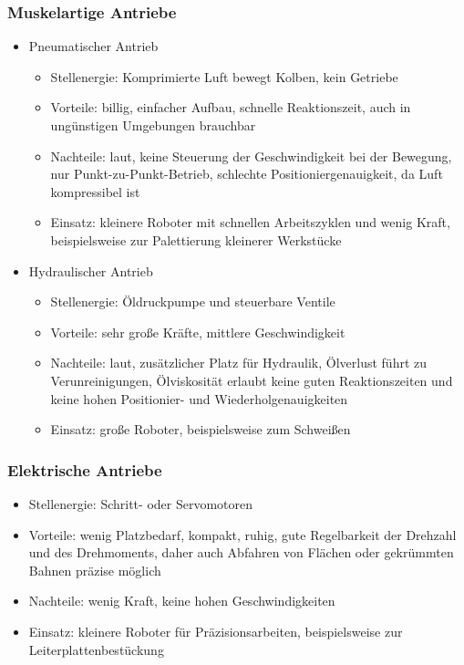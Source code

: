 \documentclass[paper=a4, fontsize=11pt]{scrartcl} %
\numberwithin{equation}{section} %
\numberwithin{figure}{section} %
\numberwithin{table}{section} %
\begin{document}
\subsubsection{Muskelartige Antriebe}

\begin{itemize}
\item Pneumatischer Antrieb
\begin{itemize}
\item Stellenergie: Komprimierte Luft bewegt Kolben, kein Getriebe
\item Vorteile: billig, einfacher Aufbau, schnelle Reaktionszeit, auch in ungünstigen Umgebungen brauchbar
\item Nachteile: laut, keine Steuerung der Geschwindigkeit bei der Bewegung, nur Punkt-zu-Punkt-Betrieb, schlechte Positioniergenauigkeit, da Luft kompressibel ist
\item Einsatz: kleinere Roboter mit schnellen Arbeitszyklen und wenig Kraft, beispielsweise zur Palettierung kleinerer Werkstücke
\end{itemize}
\item Hydraulischer Antrieb
\begin{itemize}
\item Stellenergie: Öldruckpumpe und steuerbare Ventile
\item Vorteile: sehr große Kräfte, mittlere Geschwindigkeit
\item Nachteile: laut, zusätzlicher Platz für Hydraulik, Ölverlust führt zu Verunreinigungen, Ölviskosität erlaubt keine guten Reaktionszeiten und keine hohen Positionier- und Wiederholgenauigkeiten
\item Einsatz: große Roboter, beispielsweise zum Schweißen
\end{itemize}
\end{itemize}

\subsubsection{Elektrische Antriebe}

\begin{itemize}
\item Stellenergie: Schritt- oder Servomotoren
\item Vorteile: wenig Platzbedarf, kompakt, ruhig, gute Regelbarkeit der Drehzahl und des Drehmoments, daher auch Abfahren von Flächen oder gekrümmten Bahnen präzise möglich
\item Nachteile: wenig Kraft, keine hohen Geschwindigkeiten
\item Einsatz: kleinere Roboter für Präzisionsarbeiten, beispielsweise zur Leiterplattenbestückung
\end{itemize}
\end{document}
